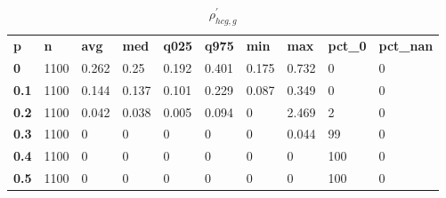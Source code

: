 \begin{table}[h]
 \centering 
\footnotesize
\caption{$\rho_{hcg,g}^\prime $}
\label{tab:alphahcgg}
\begin{tabular}[h]{| l l l l l l l l l l|
    } \hline
\textbf{ p} & \textbf{ n} & \textbf{ avg} & \textbf{ med} & \textbf{ q025} & \textbf{ q975} & \textbf{ min} & \textbf{ max} & \textbf{ pct\_0} & \textbf{ pct\_nan}
           \\
  \textbf{  0} & 1100 & 0.262 &  0.25 & 0.192 & 0.401 & 0.175 & 0.732 &   0 & 0
           \\
  \textbf{0.1} & 1100 & 0.144 & 0.137 & 0.101 & 0.229 & 0.087 & 0.349 &   0 & 0
           \\
  \textbf{0.2} & 1100 & 0.042 & 0.038 & 0.005 & 0.094 &     0 & 2.469 &   2 & 0
           \\
  \textbf{0.3} & 1100 &     0 &     0 &     0 &     0 &     0 & 0.044 &  99 & 0
           \\
  \textbf{0.4} & 1100 &     0 &     0 &     0 &     0 &     0 &     0 & 100 & 0
           \\
  \textbf{0.5} & 1100 &     0 &     0 &     0 &     0 &     0 &     0 & 100 & 0
           \\
 \hline \end{tabular}
 \end{table}
